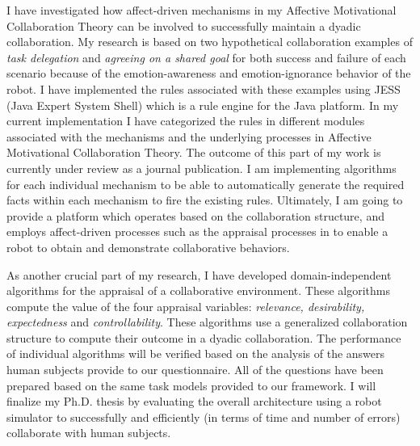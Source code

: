 \documentclass[a4paper, 11pt]{article}
\begin{document}
\begin{small}
I have investigated how affect-driven mechanisms in my Affective Motivational
Collaboration Theory can be involved to successfully maintain a dyadic
collaboration. My research is based on two hypothetical collaboration examples
of \textit{task delegation} and \textit{agreeing on a shared goal} for both
success and failure of each scenario because of the emotion-awareness and
emotion-ignorance behavior of the robot. I have implemented the rules associated
with these examples using JESS (Java Expert System Shell) which is a rule engine
for the Java platform. In my current implementation I have categorized the rules
in different modules associated with the mechanisms and the underlying processes
in Affective Motivational Collaboration Theory. The outcome of this part of my
work is currently under review as a journal publication. I am implementing
algorithms for each individual mechanism to be able to automatically generate
the required facts within each mechanism to fire the existing rules. Ultimately,
I am going to provide a platform which operates based on the collaboration
structure, and employs affect-driven processes such as the appraisal processes
in \cite{marsella:ema-process-model} to enable a robot to obtain and demonstrate
collaborative behaviors.


As another crucial part of my research, I have developed domain-independent
algorithms for the appraisal of a collaborative environment. These algorithms
compute the value of the four appraisal variables: \textit{relevance,
desirability, expectedness} and \textit{controllability}. These algorithms use a
generalized collaboration structure to compute their outcome in a dyadic
collaboration. The performance of individual algorithms will be verified based
on the analysis of the answers human subjects provide to our questionnaire. All
of the questions have been prepared based on the same task models provided to
our framework. I will finalize my Ph.D. thesis by evaluating the overall
architecture using a robot simulator to successfully and efficiently (in terms
of time and number of errors) collaborate with human subjects.


\end{small}
\end{document}
